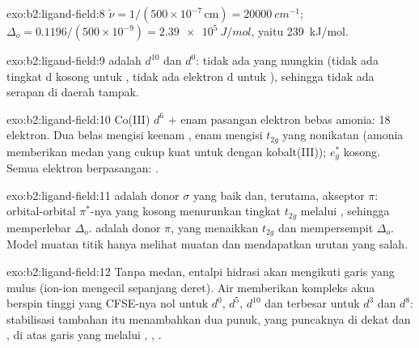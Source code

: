 \begin{solution}{exo:b2:ligand-field:8}
$\tilde\nu = 1/(500 \times 10^{-7}\,\text{cm}) = \qty{20000}{cm^{-1}}$; $\Delta_o =
0.1196/(500 \times 10^{-9}) = \qty{2.39e5}{J/mol}$, yaitu \qty{239}{kJ/mol}.
\end{solution}

\begin{solution}{exo:b2:ligand-field:9}
 adalah $d^{10}$ dan  $d^0$: tidak ada  yang
mungkin (tidak ada tingkat d kosong untuk , tidak ada elektron d
untuk ), sehingga tidak ada serapan di daerah tampak.
\end{solution}

\begin{solution}{exo:b2:ligand-field:10}
Co(III) $d^6$ + enam pasangan elektron bebas amonia: 18 elektron. Dua belas
mengisi keenam , enam mengisi $t_{2g}$ yang nonikatan (amonia
memberikan medan yang cukup kuat untuk  dengan kobalt(III)); $e_g^*$
kosong. Semua elektron berpasangan: .
\end{solution}

\begin{solution}{exo:b2:ligand-field:11}
 adalah donor $\sigma$ yang baik dan, terutama, akseptor $\pi$:
orbital-orbital $\pi^*$-nya yang kosong menurunkan tingkat $t_{2g}$ melalui
, sehingga memperlebar $\Delta_o$.  adalah donor $\pi$, yang
menaikkan $t_{2g}$ dan mempersempit $\Delta_o$. Model muatan titik hanya
melihat muatan dan mendapatkan urutan yang salah.
\end{solution}

\begin{solution}{exo:b2:ligand-field:12}
Tanpa medan, entalpi hidrasi akan mengikuti garis yang mulus (ion-ion
mengecil sepanjang deret). Air memberikan kompleks akua berspin tinggi yang
CFSE-nya nol untuk $d^0$, $d^5$, $d^{10}$
dan terbesar untuk $d^3$ dan $d^8$: stabilisasi tambahan itu menambahkan
dua punuk, yang puncaknya di dekat  dan , di atas garis
yang melalui , , .
\end{solution}

